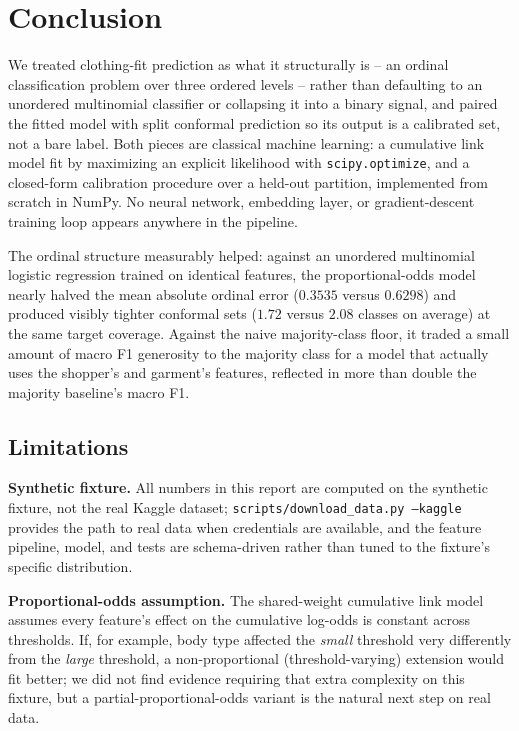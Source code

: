 \section{Conclusion}
\label{sec:conclusion}

We treated clothing-fit prediction as what it structurally is -- an ordinal
classification problem over three ordered levels -- rather than defaulting
to an unordered multinomial classifier or collapsing it into a binary
signal, and paired the fitted model with split conformal prediction so its
output is a calibrated set, not a bare label. Both pieces are classical
machine learning: a cumulative link model fit by maximizing an explicit
likelihood with \texttt{scipy.optimize}, and a closed-form calibration
procedure over a held-out partition, implemented from scratch in NumPy. No
neural network, embedding layer, or gradient-descent training loop appears
anywhere in the pipeline.

The ordinal structure measurably helped: against an unordered multinomial
logistic regression trained on identical features, the proportional-odds
model nearly halved the mean absolute ordinal error ($0.3535$ versus
$0.6298$) and produced visibly tighter conformal sets ($1.72$ versus $2.08$
classes on average) at the same target coverage. Against the naive
majority-class floor, it traded a small amount of macro F1 generosity to
the majority class for a model that actually uses the shopper's and
garment's features, reflected in more than double the majority baseline's
macro F1.

\subsection{Limitations}

\textbf{Synthetic fixture.} All numbers in this report are computed on the
synthetic fixture, not the real Kaggle dataset; \texttt{scripts/download\_data.py
--kaggle} provides the path to real data when credentials are available, and
the feature pipeline, model, and tests are schema-driven rather than tuned to
the fixture's specific distribution.

\textbf{Proportional-odds assumption.} The shared-weight cumulative link
model assumes every feature's effect on the cumulative log-odds is constant
across thresholds. If, for example, body type affected the \emph{small}
threshold very differently from the \emph{large} threshold, a
non-proportional (threshold-varying) extension would fit better; we did not
find evidence requiring that extra complexity on this fixture, but a
partial-proportional-odds variant is the natural next step on real data.

